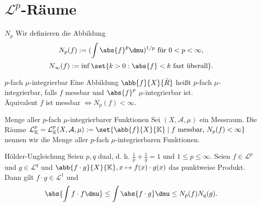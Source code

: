 \section*{\(\mathcal{L}^p\)-Räume}

\begin{karte}{\(N_p\)}
	Wir definieren die Abbildung 
	\[ N_p(f) := (\int \abs{f}^p \dmu)^{1/p} \text{ für } 0 < p < \infty, \]
	\[ N_\infty(f) := \inf \set{ k > 0 : \abs{f} < k \text{ fast überall} }. \]
\end{karte}

\begin{karte}{\(p\)-fach \(\mu\)-integrierbar}
	Eine Abbildung \( \abb{f}{X}{\bar{R}} \) heißt \(p\)-fach \(\mu\)-integrierbar, falls 
	\(f\) messbar und \( \abs{f}^p \) \( \mu \)-integrierbar ist.\\
	Äquivalent \(f\) ist messbar \( \Leftrightarrow N_p(f) < \infty \).
\end{karte}

\begin{karte}{Menge aller \(p\)-fach \(\mu\)-integrierbarer Funktionen}
	Sei \( (X, \mathcal{A}, \mu) \) ein Messraum. 
	Die Räume \( \mathcal{L}_\mathbb{K}^p 
	= \mathcal{L}_\mathbb{K}^p(X, \mathcal{A}, \mu) := \set{\abb{f}{X}{\mathbb{K}} \;|\; 
	f \text{ messbar, } N_p(f) < \infty } \) nennen wir die Menge aller \(p\)-fach \(\mu\)-integrierbaren Funktionen.
\end{karte}

\begin{karte}{Hölder-Ungleichung}
	Seien \(p, q\) dual, d. h. \(\frac{1}{p} + \frac{1}{q} = 1\) 
	und \( 1 \leq p \leq \infty \). 
	Seien \( f \in \mathcal{L}^p \) und 
	\( g \in \mathcal{L}^q \) und 
	\( \abb{f \cdot g}{X}{\mathbb{K}}, x \mapsto f(x) \cdot g(x) \) das punktweise Produkt.\\
	Dann gilt \( f\cdot g \in \mathcal{L}^1 \) und 
	\[ \abs{ \int f \cdot f \dmu } \leq \int \abs{f \cdot g} \dmu \leq N_p(f) N_q(g). \]
\end{karte}